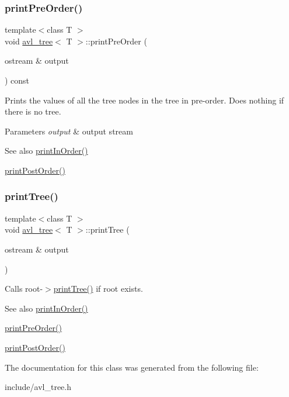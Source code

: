\subsubsection{\texorpdfstring{print\+Pre\+Order()}{printPreOrder()}}
{\footnotesize\ttfamily template$<$class T $>$ \\
void \hyperlink{classavl__tree}{avl\+\_\+tree}$<$ T $>$\+::print\+Pre\+Order (\begin{DoxyParamCaption}\item[{ostream \&}]{output }\end{DoxyParamCaption}) const\hspace{0.3cm}{\ttfamily [inline]}}

Prints the values of all the tree nodes in the tree in pre-\/order. Does nothing if there is no tree. 
\begin{DoxyParams}{Parameters}
{\em output} & output stream \\
\hline
\end{DoxyParams}
\begin{DoxySeeAlso}{See also}
\hyperlink{classavl__tree_ac7f553c3883b66f7758a71697bae5118}{print\+In\+Order()} 

\hyperlink{classavl__tree_a982fc15291d6a645964a9e7743383004}{print\+Post\+Order()} 
\end{DoxySeeAlso}
\mbox{\label{classavl__tree_aedc1c7577f8239f7b5ac939b6291fadd}} 
\subsubsection{\texorpdfstring{print\+Tree()}{printTree()}}
{\footnotesize\ttfamily template$<$class T $>$ \\
void \hyperlink{classavl__tree}{avl\+\_\+tree}$<$ T $>$\+::print\+Tree (\begin{DoxyParamCaption}\item[{ostream \&}]{output }\end{DoxyParamCaption})\hspace{0.3cm}{\ttfamily [inline]}}

Calls root-\/$>$\hyperlink{classavl__tree_aedc1c7577f8239f7b5ac939b6291fadd}{print\+Tree()} if root exists. \begin{DoxySeeAlso}{See also}
\hyperlink{classavl__tree_ac7f553c3883b66f7758a71697bae5118}{print\+In\+Order()} 

\hyperlink{classavl__tree_a789673966eca817f4efbf6bf17644c80}{print\+Pre\+Order()} 

\hyperlink{classavl__tree_a982fc15291d6a645964a9e7743383004}{print\+Post\+Order()} 
\end{DoxySeeAlso}


The documentation for this class was generated from the following file\+:\begin{DoxyCompactItemize}
\item 
include/avl\+\_\+tree.\+h\end{DoxyCompactItemize}
